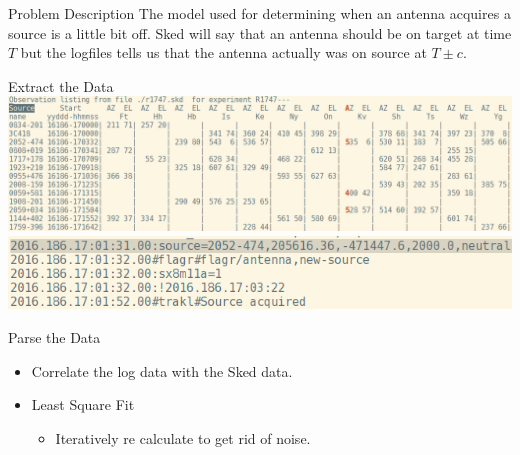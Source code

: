 \documentclass{beamer}
\begin{document}
    \begin{frame}{Problem Description}
        The model used for determining when an antenna acquires a source is a
        little bit off. Sked will say that an antenna should be on target at
        time $T$ but the logfiles tells us that the antenna actually was on
        source at $T \pm c$.
    \end{frame}
    \begin{frame}{Extract the Data}
        \centering
        \includegraphics[width=1\columnwidth]{skds}\\[2ex]
        \includegraphics[width=0.75\columnwidth]{logs}
    \end{frame}
    \begin{frame}{Parse the Data}
        \begin{itemize}[<+-|alert@+>]
            \item Correlate the log data with the Sked data.
            \item Least Square Fit
            \begin{itemize}[<+-|alert@+>]
                \item Iteratively re calculate to get rid of noise.
            \end{itemize}
        \end{itemize}
    \end{frame}
\end{document}
